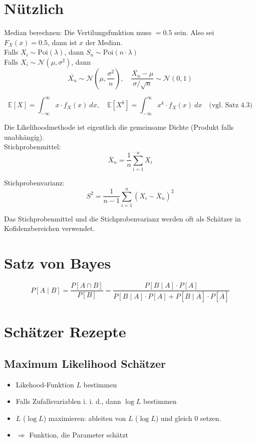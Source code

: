 \section{Nützlich}

Median berechnen: Die Vertilungsfunktion muss $= 0.5$ sein. Also sei $F_X(x) = 0.5$, dann ist $x$ der Median.\\

Falls $X_i \sim \text{Poi}(\lambda)$, dann $S_n \sim \text{Poi}(n \cdot \lambda)$
\\

Falls $X_i \sim \mathcal{N}(\mu, \sigma^2)$, dann $$\overline{X_n} \sim \mathcal{N}(\mu, \frac{\sigma^2}{n}),\quad\frac{\overline{X_n}-\mu}{\sigma / \sqrt{n}} \sim \mathcal{N}(0, 1)$$

$$
	\mathbb{E}[X] = \int_{-\infty}^\infty x \cdot f_X(x)\ dx,\quad
	\mathbb{E}[X^k] = \int_{-\infty}^\infty x^k \cdot f_X(x)\ dx\quad
	\text{(vgl. Satz 4.3)}
$$

Die Likelihoodmethode ist eigentlich die gemeinsame Dichte (Produkt falls unabhängig).\\

Stichprobenmittel: $$\overline{X}_n = \frac{1}{n	}\sum_{i=1}^nX_i$$

Stichprobenvarianz: $$S^2 = \frac{1}{n-1}\sum^n_{i=1}\left(X_i-\overline{X}_n\right)^2$$

Das Stichprobenmittel und die Stichprobenvarianz werden oft als Schätzer in Kofidenzbereichen verwendet.\\

\section{Satz von Bayes}

\[
	P[A\mid B] =
	\frac{P[A \cap B]}{P[B]} =
	\frac{P[B\mid A]\cdot P[A]}{P[B\mid A]\cdot P[A] + P[B \mid \overline{A}]\cdot P[\overline{A}]}
\]



\section{Schätzer Rezepte}

\subsection{Maximum Likelihood Schätzer}

\begin{itemize}
	\item Likehood-Funktion $L$ bestimmen
	\item Falls Zufallsvariablen i. i. d., dann $\log L$ bestimmen
	\item $L$ ($\log L$) maximieren: ableiten von $L$ ($\log L$) und gleich $0$ setzen.
	\item $\Rightarrow$ Funktion, die Parameter schätzt
\end{itemize}

